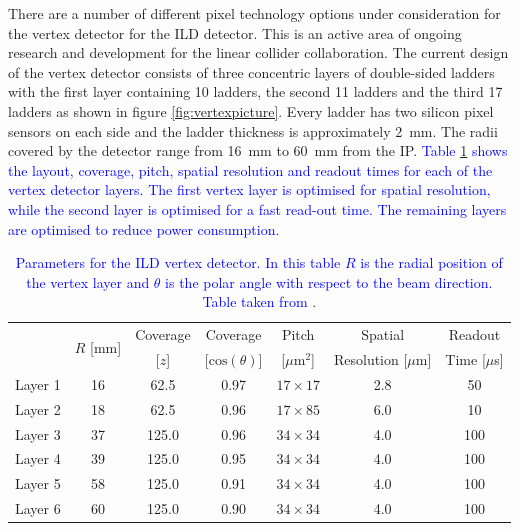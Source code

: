 There are a number of different pixel technology options under consideration for the vertex detector for the ILD detector.  This is an active area of ongoing research and development for the linear collider collaboration.  The current design of the vertex detector consists of three concentric layers of double-sided ladders with the first layer containing 10 ladders, the second 11 ladders and the third 17 ladders as shown in figure \ref{fig:vertexpicture}.  Every ladder has two silicon pixel sensors on each side and the ladder thickness is approximately 2~mm.  The radii covered by the detector range from 16~mm to 60~mm from the IP.  \textcolor{blue}{Table \ref{table:vertexdetectorparam} shows the layout, coverage, pitch, spatial resolution and readout times for each of the vertex detector layers.  The first vertex layer is optimised for spatial resolution, while the second layer is optimised for a fast read-out time.  The remaining layers are optimised to reduce power consumption.}  

\begin{table}[h!]
\centering
\begin{tabular}{ l c c c c c c}
\hline
& \multirow{2}{*}{$R$ [mm]} & Coverage & Coverage & Pitch & Spatial & Readout \\
& & [$z$] & [$\text{cos}(\theta)$] & [$\mu\text{m}^{2}$] & Resolution [$\mu$m] & Time [$\mu$s] \\
\hline
Layer 1 & 16 & 62.5 & 0.97 & $17 \times 17$ & 2.8 & 50 \\
Layer 2 & 18 & 62.5 & 0.96 & $17 \times 85$ & 6.0 & 10 \\
\hline
Layer 3 & 37 & 125.0 & 0.96 & $34 \times 34$ & 4.0 & 100 \\
Layer 4 & 39 & 125.0 & 0.95 & $34 \times 34$ & 4.0 & 100 \\
\hline
Layer 5 & 58 & 125.0 & 0.91 & $34 \times 34$ & 4.0 & 100 \\
Layer 6 & 60 & 125.0 & 0.90 & $34 \times 34$ & 4.0 & 100 \\
\hline
\end{tabular}
\caption[Parameters for the ILD vertex detector.  In this table $R$ is the radial position of the vertex layer and $\theta$ is the polar angle with respect to the beam direction.  Table taken from \cite{Behnke:2013lya}.]{\textcolor{blue}{Parameters for the ILD vertex detector.  In this table $R$ is the radial position of the vertex layer and $\theta$ is the polar angle with respect to the beam direction.  Table taken from \cite{Behnke:2013lya}}.}
\label{table:vertexdetectorparam}
\end{table}

